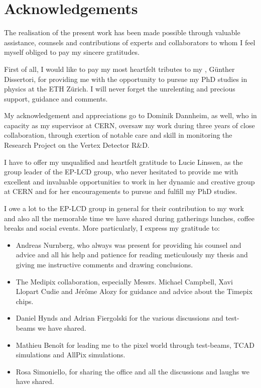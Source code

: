 \chapter{Acknowledgements}
\label{sec:ack}

The realisation of the present work has been made possible through
valuable assistance, counsels and contributions of experts and
collaborators to whom I feel myself obliged to pay my sincere
gratitudes.

First of all, I would like to pay my most heartfelt tributes to my ,
Günther Dissertori, for providing me with the opportunity to pursue my
PhD studies in physics at the ETH Zürich. I will never forget the
unrelenting and precious support, guidance and comments.


My acknowledgement and appreciations go to Dominik Dannheim, as well,
who in capacity as my supervisor at CERN, oversaw my work during three
years of close collaboration, through exertion of notable care and
skill in monitoring the Research Project on the Vertex Detector R\&D.

I have to offer my unqualified and heartfelt gratitude to Lucie
Linssen, as the group leader of the EP-LCD group, who never hesitated
to provide me with excellent and invaluable opportunities to work in
her dynamic and creative group at CERN and for her encouragements to
pursue and fulfill my PhD studies.

I owe a lot to the EP-LCD group in general for their contribution to
my work and also all the memorable time we have shared during
gatherings lunches, coffee breaks and social events. More
particularly, I express my gratitude to:

\begin{itemize}
\item Andreas Nurnberg, who always was present for providing his
  counsel and advice and all his help and patience for reading
  meticulously my thesis and giving me instructive comments and
  drawing conclusions.

\item The Medipix collaboration, especially Messrs. Michael Campbell,
  Xavi Llopart Cudie and Jérôme Alozy for guidance and advice about
  the Timepix chips.

\item Daniel Hynds and Adrian Fiergolski for the various discussions
  and test-beams we have shared.

\item Mathieu Benoît for leading me to the pixel world through
  test-beams, TCAD simulations and AllPix simulations.

\item Rosa Simoniello, for sharing the office and all the discussions
  and laughs we have shared.
\end{itemize}

